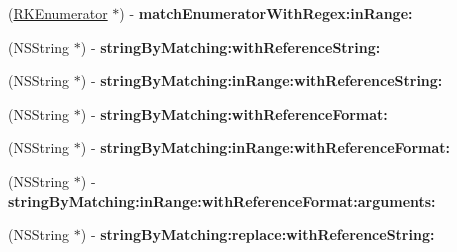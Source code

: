 \begin{DoxyCompactItemize}
\item 
\hypertarget{interface_n_s_string_07_regex_kit_additions_08_ace35946c116b64d5c3df42569cd2c05e}{(\hyperlink{interface_r_k_enumerator}{R\-K\-Enumerator} $\ast$) -\/ {\bfseries match\-Enumerator\-With\-Regex\-:in\-Range\-:}}\label{interface_n_s_string_07_regex_kit_additions_08_ace35946c116b64d5c3df42569cd2c05e}

\item 
\hypertarget{interface_n_s_string_07_regex_kit_additions_08_a9ac271d2875ed1472607d100c81761aa}{(N\-S\-String $\ast$) -\/ {\bfseries string\-By\-Matching\-:with\-Reference\-String\-:}}\label{interface_n_s_string_07_regex_kit_additions_08_a9ac271d2875ed1472607d100c81761aa}

\item 
\hypertarget{interface_n_s_string_07_regex_kit_additions_08_a1c367a696d5073151797a6aa5e123d01}{(N\-S\-String $\ast$) -\/ {\bfseries string\-By\-Matching\-:in\-Range\-:with\-Reference\-String\-:}}\label{interface_n_s_string_07_regex_kit_additions_08_a1c367a696d5073151797a6aa5e123d01}

\item 
\hypertarget{interface_n_s_string_07_regex_kit_additions_08_a1f6e91c871bed898c611b44b3b9d29ed}{(N\-S\-String $\ast$) -\/ {\bfseries string\-By\-Matching\-:with\-Reference\-Format\-:}}\label{interface_n_s_string_07_regex_kit_additions_08_a1f6e91c871bed898c611b44b3b9d29ed}

\item 
\hypertarget{interface_n_s_string_07_regex_kit_additions_08_a741544365f57cacb163e3956e43b2a20}{(N\-S\-String $\ast$) -\/ {\bfseries string\-By\-Matching\-:in\-Range\-:with\-Reference\-Format\-:}}\label{interface_n_s_string_07_regex_kit_additions_08_a741544365f57cacb163e3956e43b2a20}

\item 
\hypertarget{interface_n_s_string_07_regex_kit_additions_08_a9b8a72142b5c51c7692e56038a3fc91e}{(N\-S\-String $\ast$) -\/ {\bfseries string\-By\-Matching\-:in\-Range\-:with\-Reference\-Format\-:arguments\-:}}\label{interface_n_s_string_07_regex_kit_additions_08_a9b8a72142b5c51c7692e56038a3fc91e}

\item 
\hypertarget{interface_n_s_string_07_regex_kit_additions_08_a3f51f5ce2ed14f1763dbdfbd002db51c}{(N\-S\-String $\ast$) -\/ {\bfseries string\-By\-Matching\-:replace\-:with\-Reference\-String\-:}}\label{interface_n_s_string_07_regex_kit_additions_08_a3f51f5ce2ed14f1763dbdfbd002db51c}


\end{DoxyCompactItemize}
